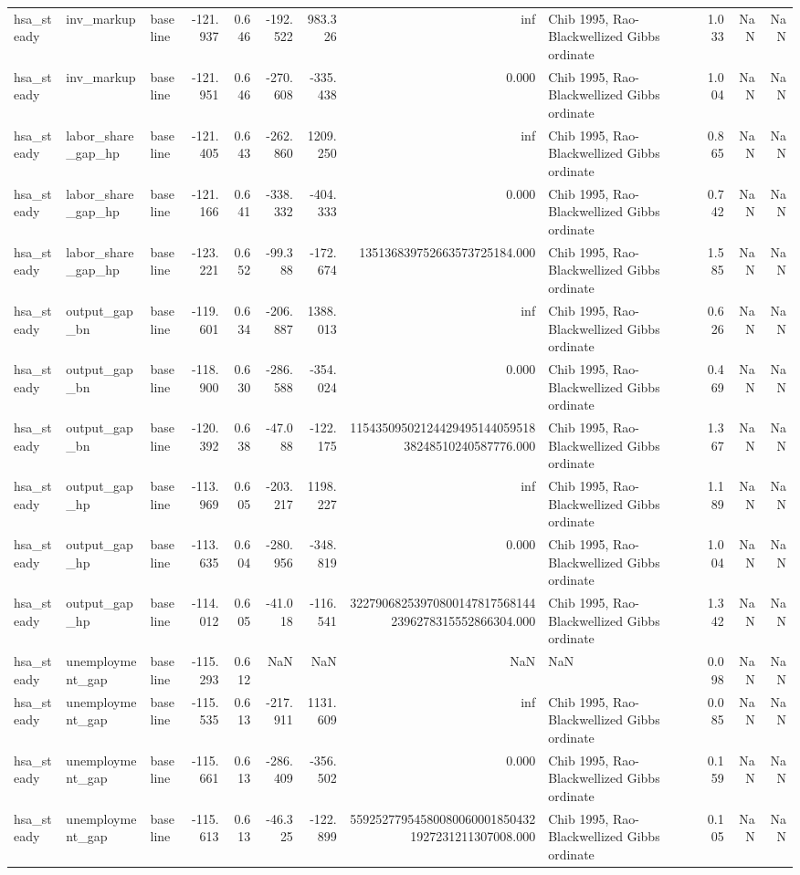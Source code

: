 \begin{tabular}{lllrrrrrlrrr}
hsa\_steady & inv\_markup & baseline & -121.937 & 0.646 & -192.522 & 983.326 & inf & Chib 1995, Rao-Blackwellized Gibbs ordinate & 1.033 & NaN & NaN \\
hsa\_steady & inv\_markup & baseline & -121.951 & 0.646 & -270.608 & -335.438 & 0.000 & Chib 1995, Rao-Blackwellized Gibbs ordinate & 1.004 & NaN & NaN \\
hsa\_steady & labor\_share\_gap\_hp & baseline & -121.405 & 0.643 & -262.860 & 1209.250 & inf & Chib 1995, Rao-Blackwellized Gibbs ordinate & 0.865 & NaN & NaN \\
hsa\_steady & labor\_share\_gap\_hp & baseline & -121.166 & 0.641 & -338.332 & -404.333 & 0.000 & Chib 1995, Rao-Blackwellized Gibbs ordinate & 0.742 & NaN & NaN \\
hsa\_steady & labor\_share\_gap\_hp & baseline & -123.221 & 0.652 & -99.388 & -172.674 & 135136839752663573725184.000 & Chib 1995, Rao-Blackwellized Gibbs ordinate & 1.585 & NaN & NaN \\
hsa\_steady & output\_gap\_bn & baseline & -119.601 & 0.634 & -206.887 & 1388.013 & inf & Chib 1995, Rao-Blackwellized Gibbs ordinate & 0.626 & NaN & NaN \\
hsa\_steady & output\_gap\_bn & baseline & -118.900 & 0.630 & -286.588 & -354.024 & 0.000 & Chib 1995, Rao-Blackwellized Gibbs ordinate & 0.469 & NaN & NaN \\
hsa\_steady & output\_gap\_bn & baseline & -120.392 & 0.638 & -47.088 & -122.175 & 1154350950212442949514405951838248510240587776.000 & Chib 1995, Rao-Blackwellized Gibbs ordinate & 1.367 & NaN & NaN \\
hsa\_steady & output\_gap\_hp & baseline & -113.969 & 0.605 & -203.217 & 1198.227 & inf & Chib 1995, Rao-Blackwellized Gibbs ordinate & 1.189 & NaN & NaN \\
hsa\_steady & output\_gap\_hp & baseline & -113.635 & 0.604 & -280.956 & -348.819 & 0.000 & Chib 1995, Rao-Blackwellized Gibbs ordinate & 1.004 & NaN & NaN \\
hsa\_steady & output\_gap\_hp & baseline & -114.012 & 0.605 & -41.018 & -116.541 & 322790682539708001478175681442396278315552866304.000 & Chib 1995, Rao-Blackwellized Gibbs ordinate & 1.342 & NaN & NaN \\
hsa\_steady & unemployment\_gap & baseline & -115.293 & 0.612 & NaN & NaN & NaN & NaN & 0.098 & NaN & NaN \\
hsa\_steady & unemployment\_gap & baseline & -115.535 & 0.613 & -217.911 & 1131.609 & inf & Chib 1995, Rao-Blackwellized Gibbs ordinate & 0.085 & NaN & NaN \\
hsa\_steady & unemployment\_gap & baseline & -115.661 & 0.613 & -286.409 & -356.502 & 0.000 & Chib 1995, Rao-Blackwellized Gibbs ordinate & 0.159 & NaN & NaN \\
hsa\_steady & unemployment\_gap & baseline & -115.613 & 0.613 & -46.325 & -122.899 & 559252779545800800600018504321927231211307008.000 & Chib 1995, Rao-Blackwellized Gibbs ordinate & 0.105 & NaN & NaN \\
\bottomrule
\end{tabular}
